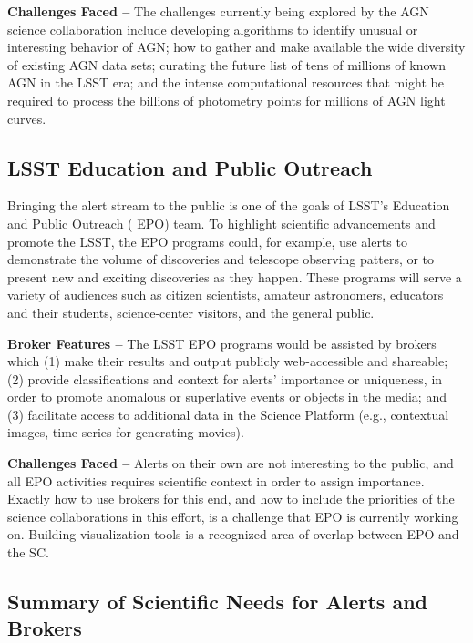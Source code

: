 {\bf Challenges Faced --}
The challenges currently being explored by the  {AGN} science collaboration include developing algorithms to identify unusual or interesting behavior of  {AGN};
how to gather and make available the wide diversity of existing  {AGN} data sets;
curating the future list of tens of millions of known  {AGN} in the  {LSST} era;
and the intense computational resources that might be required to process the billions of photometry points for millions of  {AGN} light curves.

\subsection{LSST  {Education and Public Outreach}}\label{ssec:sci_epo}

Bringing the alert stream to the public is one of the goals of  {LSST}'s  {Education and Public Outreach} ( {EPO}) team.
To highlight scientific advancements and promote the  {LSST}, the  {EPO} programs could, for example, use alerts to demonstrate the volume of discoveries and telescope observing patters, or to present new and exciting discoveries as they happen.
These programs will serve a variety of audiences such as citizen scientists, amateur astronomers, educators and their students, science-center visitors, and the general public.

{\bf  {Broker} Features --}
The  {LSST}  {EPO} programs would be assisted by brokers which
(1) make their results and output publicly web-accessible and shareable;
(2) provide classifications and context for alerts' importance or uniqueness, in order to promote anomalous or superlative events or objects in the media; and
(3) facilitate access to additional data in the  {Science Platform} (e.g., contextual images, time-series for generating movies).

{\bf Challenges Faced --}
Alerts on their own are not interesting to the public, and all  {EPO} activities requires scientific context in order to assign importance.
Exactly how to use brokers for this end, and how to include the priorities of the science collaborations in this effort, is a challenge that  {EPO} is currently working on.
Building visualization tools is a recognized area of overlap between  {EPO} and the  {SC}.

\subsection{Summary of Scientific Needs for Alerts and Brokers}
\label{ssec:sci_sum}

